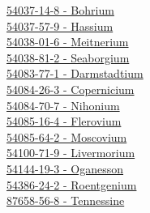 \begin{multicols}{2}
\hyperref[sec:elem-bohrium]{54037-14-8 - Bohrium}\\
\hyperref[sec:elem-hassium]{54037-57-9 - Hassium}\\
\hyperref[sec:elem-meitnerium]{54038-01-6 - Meitnerium}\\
\hyperref[sec:elem-seaborgium]{54038-81-2 - Seaborgium}\\
\hyperref[sec:elem-darmstadtium]{54083-77-1 - Darmstadtium}\\
\hyperref[sec:elem-copernicium]{54084-26-3 - Copernicium}\\
\hyperref[sec:elem-nihonium]{54084-70-7 - Nihonium}\\
\hyperref[sec:elem-flerovium]{54085-16-4 - Flerovium}\\
\hyperref[sec:elem-moscovium]{54085-64-2 - Moscovium}\\
\hyperref[sec:elem-livermorium]{54100-71-9 - Livermorium}\\
\hyperref[sec:elem-oganesson]{54144-19-3 - Oganesson}\\
\hyperref[sec:elem-roentgenium]{54386-24-2 - Roentgenium}\\
\hyperref[sec:elem-tennessine]{87658-56-8 - Tennessine}\\
\end{multicols}